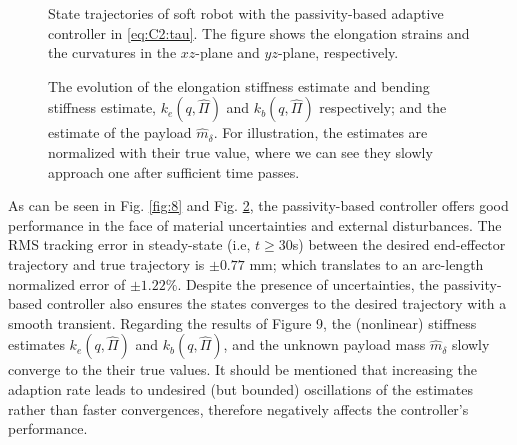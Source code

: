 %
\begin{figure}[!t]
  \vspace{-5mm}
  \centering
  
  \vspace{-3mm}
  \caption{State trajectories of soft robot with the passivity-based adaptive controller in \eqref{eq:C2:tau}. The figure shows the elongation strains and the curvatures in the $xz$-plane and $yz$-plane, respectively.}
  \label{fig:C2:natural_states}
\end{figure}
%

%


%
\begin{figure}[!t]
\centering
\caption{The evolution of the elongation stiffness estimate and bending stiffness estimate, ${k}_e(q,\hat{\Pi})$ and ${k}_b(q,\hat{\Pi})$ respectively; and the estimate of the payload $\hat{m}_\delta$. For illustration, the estimates are normalized with their true value, where we can see they slowly approach one after sufficient time passes.\label{fig:9}}
\end{figure}

As can be seen in Fig. \ref{fig:8} and Fig. \ref{fig:9}, the passivity-based controller offers good performance in the face of material uncertainties and external disturbances. The RMS tracking error in steady-state (i.e, $t \ge 30$s) between the desired end-effector trajectory and true trajectory is $\pm0.77$ mm; which translates to an arc-length normalized error of $\pm1.22\%$. Despite the presence of uncertainties, the passivity-based controller also ensures the states converges to the desired trajectory with a smooth transient. Regarding the results of Figure 9, the (nonlinear) stiffness estimates ${k}_e(q,\hat{\Pi})$ and $k_b(q,\hat{\Pi})$, and the unknown payload mass $\hat{m}_\delta$ slowly converge to the their true values. It should be mentioned that increasing the adaption rate leads to undesired (but bounded) oscillations of the estimates rather than faster convergences, therefore negatively affects the controller’s performance.
